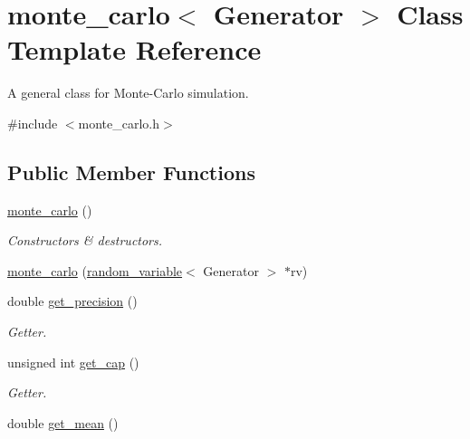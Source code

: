 \hypertarget{classmonte__carlo}{}\section{monte\+\_\+carlo$<$ Generator $>$ Class Template Reference}
\label{classmonte__carlo}


A general class for Monte-\/\+Carlo simulation.  




{\ttfamily \#include $<$monte\+\_\+carlo.\+h$>$}

\subsection*{Public Member Functions}
\begin{DoxyCompactItemize}
\item 
\mbox{\hyperlink{classmonte__carlo_a602098d8c4cd2400e8b6036a7526437d}{monte\+\_\+carlo}} ()
\begin{DoxyCompactList}\small\item\em Constructors \& destructors. \end{DoxyCompactList}\item 
\mbox{\hyperlink{classmonte__carlo_a3c7619083f106006f7549bfa21af0b70}{monte\+\_\+carlo}} (\mbox{\hyperlink{classrandom__variable}{random\+\_\+variable}}$<$ Generator $>$ $\ast$rv)
\item 
\mbox{\label{classmonte__carlo_ae8ba9ec39bb65da0a1d4c5881c3c57d9}} 
double \mbox{\hyperlink{classmonte__carlo_ae8ba9ec39bb65da0a1d4c5881c3c57d9}{get\+\_\+precision}} ()
\begin{DoxyCompactList}\small\item\em Getter. \end{DoxyCompactList}\item 
\mbox{\label{classmonte__carlo_af73122a99655bfdd93d5b72f32ea8ff1}} 
unsigned int \mbox{\hyperlink{classmonte__carlo_af73122a99655bfdd93d5b72f32ea8ff1}{get\+\_\+cap}} ()
\begin{DoxyCompactList}\small\item\em Getter. \end{DoxyCompactList}\item 
\mbox{\label{classmonte__carlo_af771b7b89e0ff85acfff8d6156a35cbf}} 
double \mbox{\hyperlink{classmonte__carlo_af771b7b89e0ff85acfff8d6156a35cbf}{get\+\_\+mean}} ()

\end{DoxyCompactItemize}
